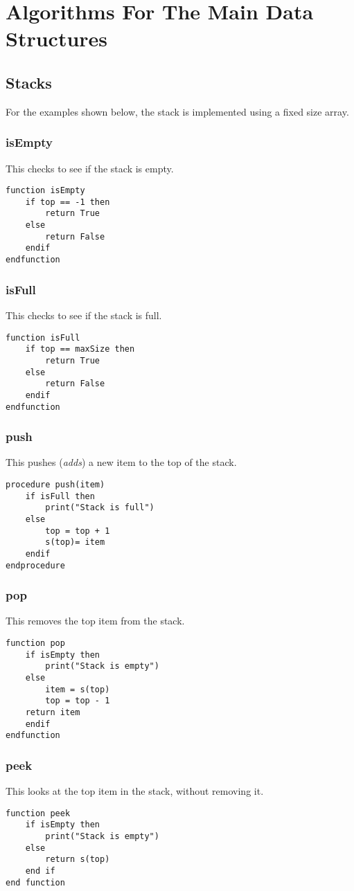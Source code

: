 \documentclass[a4paper,11pt]{article}
\begin{document}
\section{Algorithms For The Main Data Structures}
\subsection{Stacks}
For the examples shown below, the stack is implemented using a fixed size array.
\subsubsection{isEmpty}
This checks to see if the stack is empty.
\begin{Verbatim}[breaklines=true, breakanywhere=true]
function isEmpty
    if top == -1 then
        return True
    else
        return False
    endif
endfunction
\end{Verbatim}
\subsubsection{isFull}
This checks to see if the stack is full.
\begin{Verbatim}[breaklines=true, breakanywhere=true]
function isFull
    if top == maxSize then
        return True
    else
        return False
    endif
endfunction
\end{Verbatim}
\subsubsection{push}
This pushes (\textit{adds}) a new item to the top of the stack.
\begin{Verbatim}[breaklines=true, breakanywhere=true]
procedure push(item)
    if isFull then
        print("Stack is full")
    else
        top = top + 1
        s(top)= item
    endif
endprocedure
\end{Verbatim}
\subsubsection{pop}
This removes the top item from the stack.
\begin{Verbatim}[breaklines=true, breakanywhere=true]
function pop
    if isEmpty then
        print("Stack is empty")
    else
        item = s(top)
        top = top - 1
    return item
    endif
endfunction
\end{Verbatim}
\subsubsection{peek}
This looks at the top item in the stack, without removing it.
\begin{Verbatim}[breaklines=true, breakanywhere=true]
function peek
    if isEmpty then
        print("Stack is empty")
    else
        return s(top)
    end if
end function
\end{Verbatim}
\end{document}
